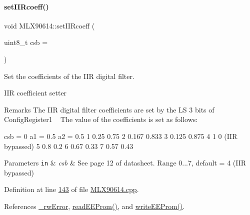 \paragraph{\texorpdfstring{set\+I\+I\+Rcoeff()}{setIIRcoeff()}}
{\footnotesize\ttfamily void M\+L\+X90614\+::set\+I\+I\+Rcoeff (\begin{DoxyParamCaption}\item[{uint8\+\_\+t}]{csb = {} }\end{DoxyParamCaption})}



Set the coefficients of the I\+IR digital filter. 

I\+IR coefficient setter

\begin{DoxyRemark}{Remarks}
The I\+IR digital filter coefficients are set by the LS 3 bits of Config\+Register1 ~\newline
 The value of the coefficients is set as follows\+: ~\newline
 {\ttfamily \begin{DoxyVerb}csb = 0   a1 = 0.5    a2 = 0.5
      1        0.25        0.75
      2        0.167       0.833
      3        0.125       0.875
      4        1           0 (IIR bypassed)
      5        0.8         0.2
      6        0.67        0.33
      7        0.57        0.43 \end{DoxyVerb}
 } 
\end{DoxyRemark}

\begin{DoxyParams}[1]{Parameters}
\mbox{\tt in}  & {\em csb} & See page 12 of datasheet. Range 0...7, default = 4 (I\+IR bypassed) \\
\hline
\end{DoxyParams}


Definition at line \mbox{\hyperlink{_m_l_x90614_8cpp_source_l00143}{143}} of file \mbox{\hyperlink{_m_l_x90614_8cpp_source}{M\+L\+X90614.\+cpp}}.



References \mbox{\hyperlink{_m_l_x90614_8h_source_l00146}{\+\_\+rw\+Error}}, \mbox{\hyperlink{_m_l_x90614_8cpp_source_l00344}{read\+E\+E\+Prom()}}, and \mbox{\hyperlink{_m_l_x90614_8cpp_source_l00354}{write\+E\+E\+Prom()}}.



